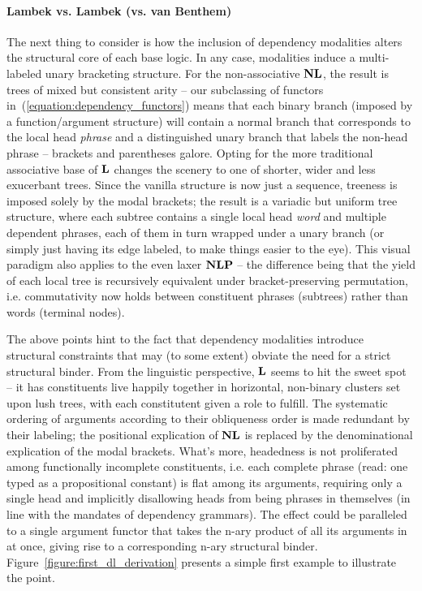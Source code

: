 \paragraph{Lambek vs. Lambek (vs. van Benthem)}
The next thing to consider is how the inclusion of dependency modalities alters the structural core of each base logic.
In any case, modalities induce a multi-labeled unary bracketing structure.
For the non-associative $\textbf{NL}$, the result is trees of mixed but consistent arity -- our subclassing of functors in~(\ref{equation:dependency_functors}) means that each binary branch (imposed by a function/argument structure) will contain a normal branch that corresponds to the local head \textit{phrase} and a distinguished unary branch that labels the non-head phrase -- brackets and parentheses galore.
Opting for the more traditional associative base of $\textbf{L}$ changes the scenery to one of shorter, wider and less exucerbant trees.
Since the vanilla structure is now just a sequence, treeness is imposed solely by the modal brackets; the result is a variadic but uniform tree structure, where each subtree contains a single local head  \textit{word} and multiple dependent phrases, each of them in turn wrapped under a unary branch (or simply just having its edge labeled, to make things easier to the eye).
This visual paradigm also applies to the even laxer $\textbf{NLP}$ -- the difference being that the yield of each local tree is recursively equivalent under bracket-preserving permutation, i.e. commutativity now holds between constituent phrases (subtrees) rather than words (terminal nodes).

The above points hint to the fact that dependency modalities introduce structural constraints that may (to some extent) obviate the need for a strict structural binder.
From the linguistic perspective, $\textbf{L}$ seems to hit the sweet spot -- it has constituents live happily together in horizontal, non-binary clusters set upon lush trees, with each constitutent given a role to fulfill.
The systematic ordering of arguments according to their obliqueness order is made redundant by their labeling; the positional explication of $\textbf{NL}$ is replaced by the denominational explication of the modal brackets.
What's more, headedness is not proliferated among functionally incomplete constituents, i.e. each complete phrase (read: one typed as a propositional constant) is flat among its arguments, requiring only a single head and implicitly disallowing heads from being phrases in themselves (in line with the mandates of dependency grammars). 
The effect could be paralleled to a single argument functor that takes the n-ary product of all its arguments in at once, giving rise to a corresponding n-ary structural binder.
Figure~\ref{figure:first_dl_derivation} presents a simple first example to illustrate the point.

